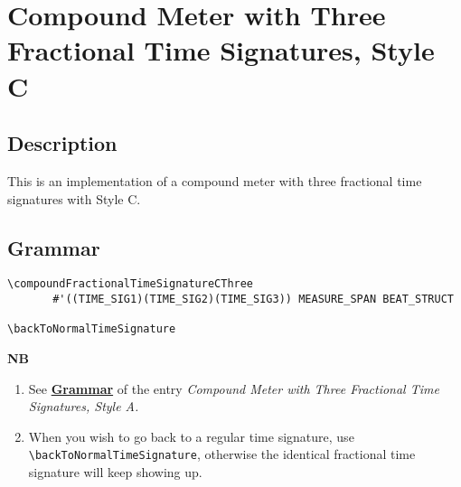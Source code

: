 \section {Compound Meter with Three Fractional Time Signatures, Style C}

\hfill
{}
\hfill

\subsection{Description}
This is an implementation of a compound meter with three fractional time signatures with Style C.  

\subsection{Grammar}
\begin{verbatim}
\compoundFractionalTimeSignatureCThree
       #'((TIME_SIG1)(TIME_SIG2)(TIME_SIG3)) MEASURE_SPAN BEAT_STRUCT

\backToNormalTimeSignature

\end{verbatim}
\textbf{NB}
\begin{enumerate}
\item See \hyperref[sec:compoundfractionalmeter_grammar]{\textbf{Grammar}} of the entry \textit{Compound Meter with Three Fractional Time Signatures, Style A.}
\item When you wish to go back to a regular time signature, use \verb|\backToNormalTimeSignature|, otherwise the identical fractional time signature will keep showing up.
\end{enumerate}

